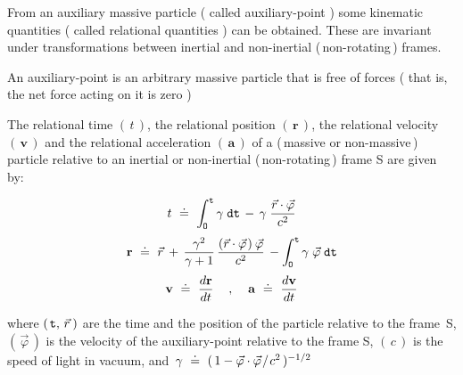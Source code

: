 \documentclass[10pt,fleqn]{article}
\begin{document}
\noindent From an auxiliary massive particle ( called auxiliary-point ) some kinematic quantities ( called relational quantities ) can be obtained. These are invariant under transformations between inertial and non-inertial (\,non-rotating\,) frames.
\par \medskip \smallskip
\noindent An auxiliary-point is an arbitrary massive particle that is free of forces ( that is, the net force acting on it is zero )
\par \medskip \smallskip
\noindent The relational time $( \, t \, )$, the relational position $( \, \mathbf{r} \, )$, the relational velocity $( \, \mathbf{v} \, )$ and the relational acceleration $( \, \mathbf{a} \, )$ of a (\,massive or non-massive\,) particle \hbox {relative} to an inertial or non-inertial (\,non-rotating\,) frame S are given by:
\par \vspace{-0.18em}
\begin{eqnarray*}
t ~\doteq~ \int_{\hspace{-0.045em}\mathtt{O}}^{\mathtt{t}} \gamma \; \mathtt{dt} \, - \, \gamma \; \frac{\vec{r} \cdot \vec{\varphi}}{c^2}
\end{eqnarray*}
\vspace{-0.15em}
\begin{eqnarray*}
\mathbf{r} ~\doteq~ \vec{r} \: + \, \frac{\gamma^2}{\gamma + 1} \, \frac{( \vec{r} \cdot \vec{\varphi} \hspace{+0.09em}) \: \vec{\varphi}}{c^2} \, - \int_{\hspace{-0.045em}\mathtt{O}}^{\mathtt{t}} \gamma \; \vec{\varphi} \; \mathtt{dt}
\end{eqnarray*}
\vspace{-0.15em}
\begin{eqnarray*}
\mathbf{v} ~\doteq~ \dfrac{d\mathbf{r}}{dt} \hspace{+1.20em} , \hspace{+1.11em} \mathbf{a} ~\doteq~ \dfrac{d\mathbf{v}}{dt}
\end{eqnarray*}
\par \vspace{+1.20em}
\noindent where $(\hspace{+0.12em}\mathtt{t}, \, \vec{r}\hspace{+0.21em})$ are the time and the position of the particle relative to the \hbox{frame S}, $( \, \vec{\varphi} \, )$ is the velocity of the auxiliary-point relative to the frame S, $( \, c \, )$ is the speed of light in vacuum, and {\small $\, \gamma ~\doteq~ (\,{1 - \vec{\varphi} \cdot \vec{\varphi}\hspace{+0.09em}/\hspace{+0.09em}c^2}\,)^{-1/2}$}
\end{document}
